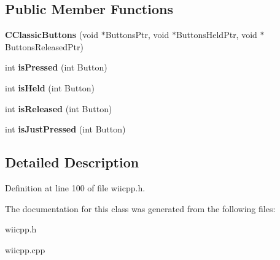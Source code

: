\subsection*{Public Member Functions}
\begin{DoxyCompactItemize}
\item 
\hypertarget{class_c_classic_buttons_ae98fc8217e2e7a38e9393be008534268}{{\bfseries C\-Classic\-Buttons} (void $\ast$Buttons\-Ptr, void $\ast$Buttons\-Held\-Ptr, void $\ast$Buttons\-Released\-Ptr)}\label{class_c_classic_buttons_ae98fc8217e2e7a38e9393be008534268}

\item 
\hypertarget{class_c_button_base_a0d4758b9e756a8c3c2bb39b907ea9170}{int {\bfseries is\-Pressed} (int Button)}\label{class_c_button_base_a0d4758b9e756a8c3c2bb39b907ea9170}

\item 
\hypertarget{class_c_button_base_a67e38daead9d22e33f6a3d85902d1f98}{int {\bfseries is\-Held} (int Button)}\label{class_c_button_base_a67e38daead9d22e33f6a3d85902d1f98}

\item 
\hypertarget{class_c_button_base_a575dee487bcca1abf29c1084dfdd5bb8}{int {\bfseries is\-Released} (int Button)}\label{class_c_button_base_a575dee487bcca1abf29c1084dfdd5bb8}

\item 
\hypertarget{class_c_button_base_ab74fd21217c5e379a613b7474af4f9b8}{int {\bfseries is\-Just\-Pressed} (int Button)}\label{class_c_button_base_ab74fd21217c5e379a613b7474af4f9b8}

\end{DoxyCompactItemize}


\subsection{Detailed Description}


Definition at line 100 of file wiicpp.\-h.



The documentation for this class was generated from the following files\-:\begin{DoxyCompactItemize}
\item 
wiicpp.\-h\item 
wiicpp.\-cpp\end{DoxyCompactItemize}
